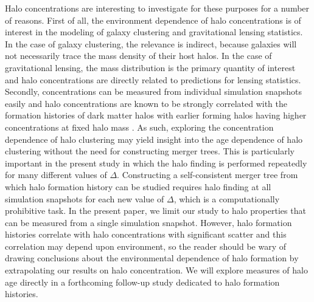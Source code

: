 \documentclass[usenatbib]{mnras}
\begin{document}
Halo concentrations are interesting to investigate for these purposes for a number of reasons. 
First of all, the environment dependence of halo concentrations is of interest in the modeling of 
galaxy clustering and gravitational lensing statistics. In the case of galaxy clustering, the relevance 
is indirect, because galaxies will not necessarily trace the mass density of their host halos. In the case 
of gravitational lensing, the mass distribution is the primary quantity of interest and halo concentrations are 
directly related to predictions for lensing statistics. Secondly, concentrations can be measured from 
individual simulation snapshots easily and halo concentrations are known to be strongly correlated with 
the formation histories of dark matter halos with earlier forming halos having higher concentrations at 
fixed halo mass \citep{wechsler_etal02, zhao_etal03, wechsler_etal06, zhao_etal09} 
. As such, exploring the concentration dependence of halo
clustering may yield insight into the age dependence of halo clustering without the need for constructing merger
trees. This is particularly important in the present study in which the halo finding is performed repeatedly for many 
different values of $\Delta$. Constructing a self-consistent merger tree from which halo formation history can be 
studied requires halo finding at all simulation snapshots for each new value of $\Delta$, which is a computationally 
prohibitive task. In the present paper, we limit our study to halo properties that can be measured from a single simulation 
snapshot. However, halo formation histories correlate with halo concentrations with significant scatter and this correlation may 
depend upon environment, so the reader should be wary of drawing conclusions about the environmental dependence of 
halo formation by extrapolating our results on halo concentration. 
We will explore measures of halo age directly in a forthcoming follow-up study dedicated to halo 
formation histories.
\end{document}

